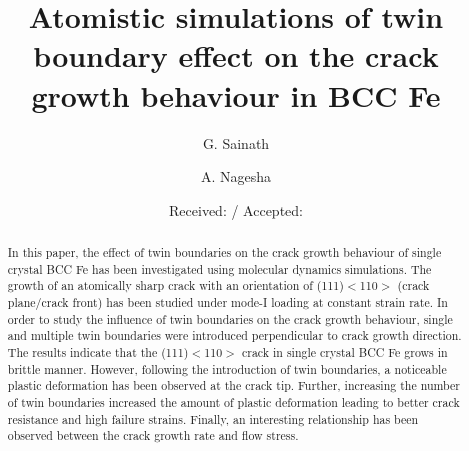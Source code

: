 \documentclass[smallextended]{svjour3}       %
\begin{document}
\title{Atomistic simulations of twin boundary effect on the crack growth behaviour in BCC Fe}

\author{G. Sainath \and   A. Nagesha }



\date{Received: / Accepted: }


\maketitle

\begin{abstract}
In this paper, the effect of twin boundaries on the crack growth behaviour of single crystal BCC Fe has been investigated using 
molecular dynamics simulations. The growth of an atomically sharp crack with an orientation of (111)$<$110$>$ (crack plane/crack 
front) has been studied under mode-I loading at constant strain rate. In order to study the influence of twin boundaries on the 
crack growth behaviour, single and multiple twin boundaries were introduced perpendicular to crack growth direction. The results 
indicate that the (111)$<$110$>$ crack in single crystal BCC Fe grows in brittle manner. However, following the introduction of 
twin boundaries, a noticeable plastic deformation has been observed at the crack tip. Further, increasing the number of twin 
boundaries increased the amount of plastic deformation leading to better crack resistance and high failure strains. Finally, an 
interesting relationship has been observed between the crack growth rate and flow stress.\\

\end{abstract}
\end{document}
